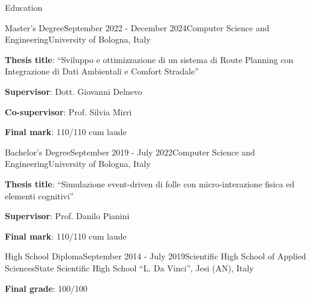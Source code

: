 \documentclass[
	11pt, %
]{resume} %
\begin{document}


\begin{rSection}{Education}
	\begin{rSubsection}{Master's Degree}{September 2022 - December 2024}{Computer Science and Engineering}{University of Bologna, Italy}
	   \item \textbf{Thesis title}: ``Sviluppo e ottimizzazione di un sistema di Route Planning con Integrazione di Dati Ambientali e Comfort Stradale''
          \item \textbf{Supervisor}: Dott. Giovanni Delnevo
          \item \textbf{Co-supervisor}: Prof. Silvia Mirri
          \item \textbf{Final mark}: 110/110 cum laude 
	\end{rSubsection}
    
    \begin{rSubsection}{Bachelor's Degree}{September 2019 - July 2022}{Computer Science and Engineering}{University of Bologna, Italy}
	   \item \textbf{Thesis title}: ``Simulazione event-driven di folle con micro-interazione fisica ed elementi cognitivi''
          \item \textbf{Supervisor}: Prof. Danilo Pianini
          \item \textbf{Final mark}: 110/110 cum laude
	\end{rSubsection}

    \begin{rSubsection}{High School Diploma}{September 2014 - July 2019}{Scientific High School of Applied Sciences}{State Scientific High School ``L. Da Vinci'', Jesi (AN), Italy}
	   \item \textbf{Final grade}: 100/100
	\end{rSubsection}
	
\end{rSection}

\end{document}
